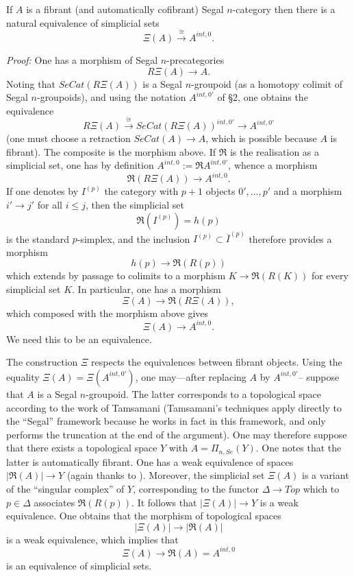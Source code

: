 \begin{lemma}
\label{sigma}
If $A$ is a fibrant (and automatically cofibrant) Segal $n$-category then
there is a natural equivalence of simplicial sets
$$
\Xi (A) \stackrel{\cong}{\rightarrow} A^{int, 0}.
$$
\end{lemma}
{\em Proof:}
One has a morphism of Segal $n$-precategories
$$
R\Xi (A) \rightarrow A.
$$
Noting that $SeCat(R\Xi (A))$ is a Segal $n$-groupoid (as a
homotopy colimit of Segal $n$-groupoids), and
using the notation $A^{int, 0'}$ of \S 2, one obtains the equivalence
$$
R\Xi (A)\stackrel{\cong}{\rightarrow}
SeCat(R\Xi (A))^{int, 0'} \rightarrow A^{int, 0'}
$$
(one must choose a retraction $SeCat(A)\rightarrow A$,
which is possible because $A$ is
fibrant). The composite is the morphism above. If $\Re$ is the
realisation as a
simplicial set, one has by definition $A^{int, 0}:= \Re A^{int, 0'}$,
whence a morphism $$
\Re (R\Xi (A)) \rightarrow A^{int, 0}.
$$
If one denotes by $I^{(p)}$ the category with $p+1$ objects $0',\ldots , p'$
and a morphism $i'\rightarrow j'$ for all $i\leq j$, then
the simplicial set
$$
\Re (I^{(p)})= h(p)
$$
is the standard $p$-simplex, and the inclusion
$I^{(p)} \subset \overline{I}^{(p)}$ therefore provides a morphism
$$
h(p)\rightarrow \Re (R(p))
$$
which extends by passage to
colimits to a morphism $K\rightarrow \Re (R(K))$ for every
simplicial set $K$. In particular, one has a morphism
$$
\Xi (A)\rightarrow \Re(R\Xi (A)),
$$
which composed with the morphism above gives
$$
\Xi (A)\rightarrow A^{int, 0}.
$$
We need this to be an equivalence.

The construction $\Xi$ respects the equivalences between fibrant objects.
Using the equality $\Xi (A) = \Xi
(A^{int, 0'})$, one may---after replacing $A$ by $A^{int, 0'}$--
suppose that $A$ is a Segal $n$-groupoid. The
latter corresponds to a
topological space according to the work of
Tamsamani \cite{Tamsamani} (Tamsamani's techniques
apply directly to the ``Segal'' framework because he works in fact
in this framework, and only performs the truncation at the end of the
argument).
One may therefore
suppose that there exists a topological space $Y$ with $A= \Pi _{n,Se}(Y)$. One
notes that the latter is automatically fibrant. One has a weak equivalence of
spaces $|\Re (A)|\rightarrow Y$ (again thanks to \cite{Tamsamani}).
Moreover, the simplicial set
$\Xi (A)$ is a variant of the ``singular complex'' of $Y$, corresponding
to the functor $\Delta \rightarrow Top$ which to $p\in
\Delta$ associates $\Re (R(p))$. It follows that $| \Xi (A)| \rightarrow Y$ is
a weak equivalence.  One obtains that the morphism of topological
spaces
$$
| \Xi (A)|\rightarrow |\Re (A)|
$$
is a weak equivalence, which implies that
$$
\Xi (A)\rightarrow \Re (A) = A^{int, 0}
$$
is an equivalence of simplicial sets.
\eop




